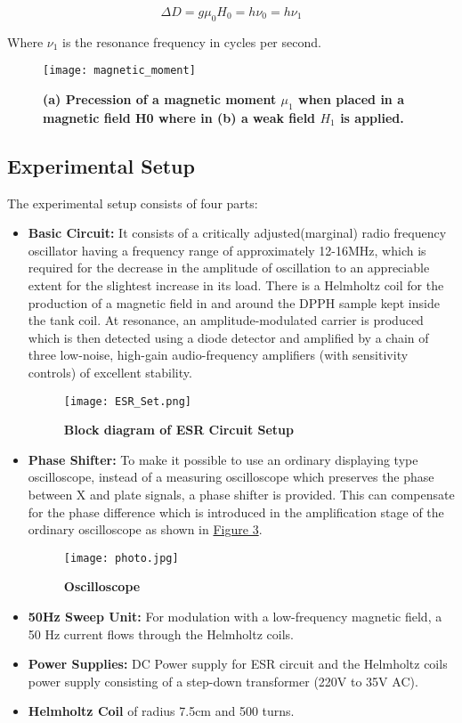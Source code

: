 		$$\Delta D = g\mu_0 H_0 = h\nu_0 = h\nu_1$$

		Where $\nu_1$ is the resonance frequency in cycles per second.

		\begin{figure}[H]
			\centering
			\texttt{[image: magnetic\_moment]}
			\caption{\textbf{(a) Precession of a magnetic moment $\mu_1$ when placed in a magnetic field H0 where in (b) a weak field $H_1$ is applied.}}
			\label{fig:1}
		\end{figure}

	\subsection{Experimental Setup}
	
		The experimental setup consists of four parts:
		\begin{itemize}
			\item \textbf{Basic Circuit:} It consists of a critically adjusted(marginal) radio frequency oscillator having a frequency range of approximately 12-16MHz, which is required for the decrease in the amplitude of oscillation to an appreciable extent for the slightest increase in its load. There is a Helmholtz coil for the production of a magnetic field in and around the DPPH sample kept inside the tank coil. At resonance, an amplitude-modulated carrier is produced which is then detected using a diode detector and amplified by a chain of three low-noise, high-gain audio-frequency amplifiers (with sensitivity controls) of excellent stability.
				\begin{figure}[H]
					\centering
					\texttt{[image: ESR\_Set.png]}
					\caption{\textbf{Block diagram of ESR Circuit Setup}}
					\label{fig:2}
				\end{figure}
			\item \textbf{Phase Shifter:} To make it possible to use an ordinary displaying type oscilloscope, instead of a measuring oscilloscope which preserves the phase between X and plate signals, a phase shifter is provided. This can compensate for the phase difference which is introduced in the amplification stage of the ordinary oscilloscope as shown in \hyperref[fig:3]{Figure 3}.
				\begin{figure}[H]
					\centering
					\texttt{[image: photo.jpg]}
					\caption{\textbf{Oscilloscope}}
					\label{fig:3}
				\end{figure}
			\item \textbf{50Hz Sweep Unit:} For modulation with a low-frequency magnetic field, a 50 Hz current flows through the Helmholtz coils.
			\item \textbf{Power Supplies:} DC Power supply for ESR circuit and the Helmholtz coils power supply consisting of a step-down transformer (220V to 35V AC).
			\item \textbf{Helmholtz Coil} of radius 7.5cm and 500 turns.
		\end{itemize}

